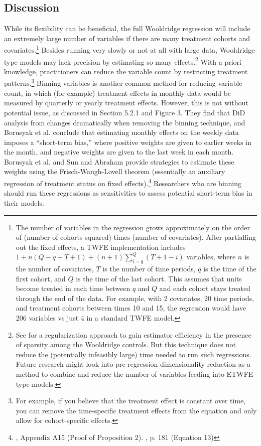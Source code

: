 \documentclass[12pt]{article}
\begin{document}
\subsection{Discussion}
While its flexibility can be beneficial, the full Wooldridge regression will include an extremely large number of variables if there are many treatment cohorts and covariates.\footnote{The number of variables in the regression grows approximately on the order of (number of cohorts squared) times (number of covariates). After partialling out the fixed effects, a TWFE implementation includes $1 + n(Q-q+T+1) + (n+1) \sum_{i=q}^Q(T+1-i)$ variables, where $n$ is the number of covariates, $T$ is the number of time periods, $q$ is the time of the first cohort, and $Q$ is the time of the last cohort. This assumes that units become treated in each time between $q$ and $Q$ and each cohort stays treated through the end of the data. For example, with 2 covariates, 20 time periods, and treatment cohorts between times 10 and 15, the regression would have 206 variables vs just 4 in a standard TWFE model.}  Besides running very slowly or not at all with large data, Wooldridge-type models may lack precision by estimating so many effects.\footnote{See \citet{faletto2023a} for a regularization approach to gain estimator efficiency in the presence of sparsity among the Wooldridge controls. But this technique does not reduce the (potentially infeasibly large) time needed to run such regressions. Future research might look into pre-regression dimensionality reduction as a method to combine and reduce the number of variables feeding into ETWFE-type models.}  With a priori knowledge, practitioners can reduce the variable count by restricting treatment patterns.\footnote{For example, if you believe that the treatment effect is constant over time, you can remove the time-specific treatment effects from the equation and only allow for cohort-specific effects.}  Binning variables is another common method for reducing variable count, in which (for example) treatment effects in monthly data would be measured by quarterly or yearly treatment effects. However, this is not without potential issue, as discussed in \citet{borusyak2024revisiting} Section 5.2.1 and Figure 3. They find that DiD analysis from \citet{broda2014} changes dramatically when removing the binning technique, and Borusyak et al. conclude that  estimating monthly effects on the weekly data imposes a “short-term bias,” where positive weights are given to earlier weeks in the month, and negative weights are given to the last week in each month. Borusyak et al. and Sun and Abraham provide strategies to estimate these weights using the Frisch-Waugh-Lovell theorem (essentially an auxiliary regression of treatment status on fixed effects).\footnote{\citet{borusyak2024revisiting}, Appendix A15 (Proof of Proposition 2). \citet{sunabr2021a}, p. 181 (Equation 13)}  Researchers who are binning should run these regressions as sensitivities to assess potential short-term bias in their models.
\end{document}
